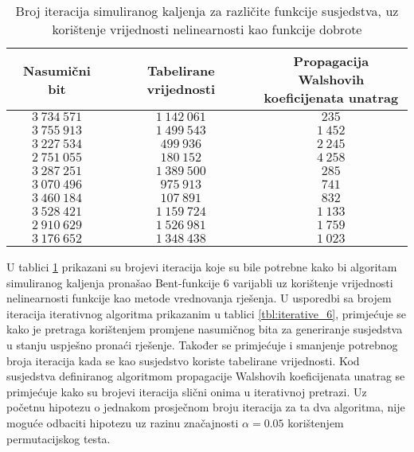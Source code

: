 \begin{table}[]
    \centering
    \begin{tabular}{ccc}
        Nasumični bit & Tabelirane vrijednosti & \makecell{Propagacija Walshovih \\ koeficijenata unatrag} \\ \hline
        $3\:734\:571$ & $1\:142\:061$ &    $235$ \\
        $3\:755\:913$ & $1\:499\:543$ & $1\:452$ \\
        $3\:227\:534$ &    $499\:936$ & $2\:245$ \\
        $2\:751\:055$ &    $180\:152$ & $4\:258$ \\
        $3\:287\:251$ & $1\:389\:500$ &    $285$ \\
        $3\:070\:496$ &    $975\:913$ &    $741$ \\
        $3\:460\:184$ &    $107\:891$ &    $832$ \\
        $3\:528\:421$ & $1\:159\:724$ & $1\:133$ \\
        $2\:910\:629$ & $1\:526\:981$ & $1\:759$ \\
        $3\:176\:652$ & $1\:348\:438$ & $1\:023$
    \end{tabular}
    \captionsetup{justification=centering}
    \caption{Broj iteracija simuliranog kaljenja za različite funkcije susjedstva, uz korištenje vrijednosti nelinearnosti kao funkcije dobrote}
    \label{tbl:simaneal_6_nonl}
\end{table}
U tablici \ref{tbl:simaneal_6_nonl} prikazani su brojevi iteracija koje su bile potrebne kako bi algoritam simuliranog kaljenja pronašao Bent-funkcije 6 varijabli uz korištenje vrijednosti nelinearnosti funkcije kao metode vrednovanja rješenja.
U usporedbi sa brojem iteracija iterativnog algoritma prikazanim u tablici \ref{tbl:iterative_6}, primjećuje se kako je pretraga korištenjem promjene nasumičnog bita za generiranje susjedstva u stanju uspješno pronaći rješenje.
Također se primjećuje i smanjenje potrebnog broja iteracija kada se kao susjedstvo koriste tabelirane vrijednosti.
Kod susjedstva definiranog algoritmom propagacije Walshovih koeficijenata unatrag se primjećuje kako su brojevi iteracija slični onima u iterativnoj pretrazi.
Uz početnu hipotezu o jednakom prosječnom broju iteracija za ta dva algoritma, nije moguće odbaciti hipotezu uz razinu značajnosti $\alpha = 0.05$ korištenjem permutacijskog testa.

